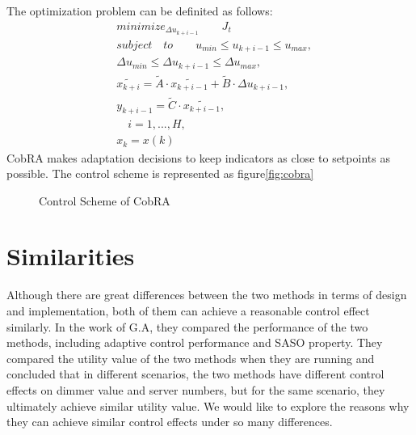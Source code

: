 \documentclass[sigconf]{acmart}
\begin{document}
The optimization problem can be definited as follows:
\begin{equation}
\begin{aligned}
&minimize_{\Delta u_{k+i-1}}\qquad J_t \\
&subject\quad to \qquad u_{min}\leq u_{k+i-1}\leq u_{max},\\
&{\Delta u_{min}}\leq{ \Delta u_{k+i-1}}\leq {\Delta u_{max}},\\
&\tilde{x_{k+i}}=\tilde{A}\cdot \tilde{x_{k+i-1}}+\tilde{B}\cdot \Delta u_{k+i-1}, \\
&y_{k+i-1}=\tilde{C}\cdot \tilde{x_{k+i-1}},\\
&\quad i=1,...,H,\\
&x_{k}=x(k)
\end{aligned}
\end{equation}
CobRA makes adaptation decisions to keep indicators as close to setpoints as possible. The control scheme is represented as figure\ref{fig:cobra}
\begin{figure}[h]
	\centering
	\caption{Control Scheme of CobRA}
\end{figure}
 
\section{Similarities}
Although there are great differences between the two methods in terms of design and implementation, both of them can achieve a reasonable control effect similarly. In the work of G.A\cite{GA}, they compared the performance of the two methods, including adaptive control performance and SASO property\cite{saso}. They compared the utility value of the two methods when they are running and concluded that in different scenarios, the two methods have different control effects on dimmer value and server numbers, but for the same scenario, they ultimately achieve similar utility value. We would like to explore the reasons why they can achieve similar control effects under so many differences. 
\end{document}
